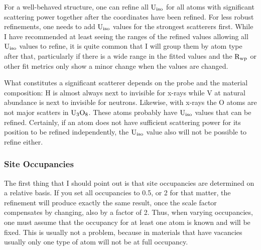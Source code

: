 For a well-behaved structure, one can refine all $\rm U_{iso}$ for all atoms with significant scattering power together after the coordinates have been refined. For less robust refinements, one needs to add $\rm U_{iso}$ values for the strongest scatterers first. While I have recommended at least seeing the ranges of the refined values allowing all $\rm U_{iso}$ values to refine, it is quite common that I will group them by atom type after that, particularly if there is a wide range in the fitted values and the $\rm R_{wp}$ or other fit metrics only show a minor change when the values are changed.

What constitutes a significant scatterer depends on the probe and the material composition: H is almost always next to invisible for x-rays while V at natural abundance is next to invisible for neutrons. Likewise, with x-rays the O atoms are not major scatters in $\rm U_3 O_8$. These atoms probably have $\rm U_{iso}$ values that can be refined. Certainly, if an atom does not have sufficient scattering power for its position to be refined independently, the $\rm U_{iso}$ value also will not be possible to refine either.  

\subsubsection{Site Occupancies}
The first thing that I should point out is that site occupancies are determined on a relative basis. If you set all occupancies to 0.5, or 2 for that matter, the refinement will produce exactly the same result, once the scale factor compensates by changing, also by a factor of 2. Thus, when varying occupancies, one must assume that the occupancy for at least one atom is known and will be fixed. This is usually not a problem, because in materials that have vacancies usually only one type of atom will not be at full occupancy. 


